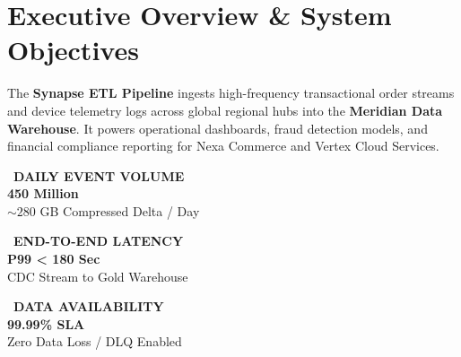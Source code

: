 \documentclass[10pt, a4paper]{article}
\begin{document}
\vspace{2pt}

\section{Executive Overview \& System Objectives}

The \textbf{Synapse ETL Pipeline} ingests high-frequency transactional order streams and device telemetry logs across global regional hubs into the \textbf{Meridian Data Warehouse}. It powers operational dashboards, fraud detection models, and financial compliance reporting for Nexa Commerce and Vertex Cloud Services.

\vspace{3pt}

\begin{minipage}[t]{0.32\textwidth}
    \begin{tcolorbox}[cardbox, colback=LightBg]
        \centering
        \textcolor{AccentTeal}{\scriptsize \faChartBar\ \textbf{DAILY EVENT VOLUME}} \\[2pt]
        {\large \bfseries 450 Million} \\[1pt]
        \tiny \textcolor{SubtleGray}{$\sim 280$ GB Compressed Delta / Day}
    \end{tcolorbox}
\end{minipage}%
\hfill
\begin{minipage}[t]{0.32\textwidth}
    \begin{tcolorbox}[cardbox, colback=LightBg]
        \centering
        \textcolor{SuccessGreen}{\scriptsize \faClock\ \textbf{END-TO-END LATENCY}} \\[2pt]
        {\large \bfseries P99 < 180 Sec} \\[1pt]
        \tiny \textcolor{SubtleGray}{CDC Stream to Gold Warehouse}
    \end{tcolorbox}
\end{minipage}%
\hfill
\begin{minipage}[t]{0.32\textwidth}
    \begin{tcolorbox}[cardbox, colback=LightBg]
        \centering
        \textcolor{PrimaryBlue}{\scriptsize \faCheckCircle\ \textbf{DATA AVAILABILITY}} \\[2pt]
        {\large \bfseries 99.99\% SLA} \\[1pt]
        \tiny \textcolor{SubtleGray}{Zero Data Loss / DLQ Enabled}
    \end{tcolorbox}
\end{minipage}
\end{document}

